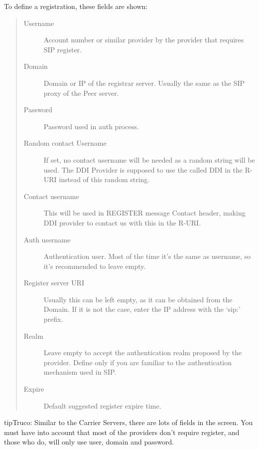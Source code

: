 \documentclass[letterpaper,10pt,spanish]{sphinxmanual}
\begin{document}
To define a registration, these fields are shown:
\begin{quote}
\begin{description}
\item[{Username}] \leavevmode
Account number or similar provider by the provider that requires SIP
register.

\item[{Domain}] \leavevmode
Domain or IP of the registrar server. Usually the same as the SIP proxy
of the Peer server.

\item[{Password}] \leavevmode
Password used in auth process.

\item[{Random contact Username}] \leavevmode
If set, no contact username will be needed as a random string will be used. The
DDI Provider is supposed to use the called DDI in the R-URI instead of this random string.

\item[{Contact username}] \leavevmode
This will be used in REGISTER message Contact header, making DDI provider to
contact us with this in the R-URI.

\item[{Auth username}] \leavevmode
Authentication user. Most of the time it's the same as username, so
it's recommended to leave empty.

\item[{Register server URI}] \leavevmode
Usually this can be left empty, as it can be obtained from the
Domain. If it is not the case, enter the IP address with the `sip:'
prefix.

\item[{Realm}] \leavevmode
Leave empty to accept the authentication realm proposed by the provider.
Define only if you are familiar to the authentication mechanism used
in SIP.

\item[{Expire}] \leavevmode
Default suggested register expire time.

\end{description}
\end{quote}

\begin{notice}{tip}{Truco:}
Similar to the Carrier Servers, there are lots of fields in the screen.
You must have into account that most of the providers don't require register,
and those who do, will only use user, domain and password.
\end{notice}
\end{document}
